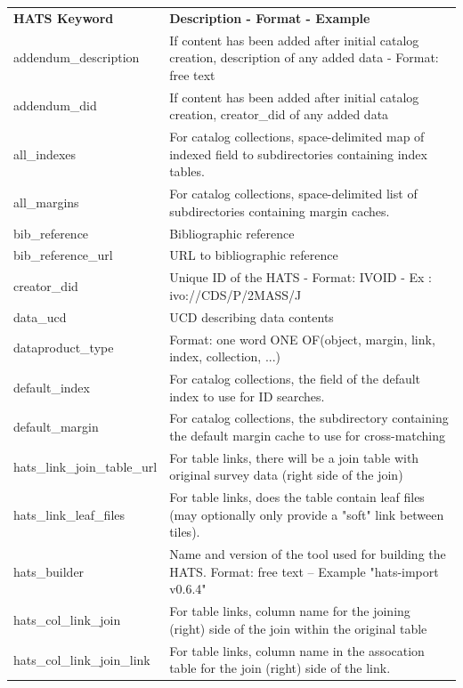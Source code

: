 \documentclass[11pt,a4paper]{ivoa}
\begin{document}
{\footnotesize
\begin{longtable}[h!]{p{} p{}}
\sptablerule
\textbf{HATS Keyword}&\textbf{Description - Format - Example}\\
\sptablerule
\endhead

addendum\_description &If content has been added after initial catalog creation, description of any added data - Format: free text \\
addendum\_did &If content has been added after initial catalog creation, creator\_did of any added data \\
all\_indexes &For catalog collections, space-delimited map of indexed field to subdirectories containing index tables. \\
all\_margins &For catalog collections, space-delimited list of subdirectories containing margin caches. \\
bib\_reference &Bibliographic reference \\
bib\_reference\_url &URL to bibliographic reference \\
creator\_did &Unique ID of the HATS - Format: IVOID - Ex : ivo://CDS/P/2MASS/J \\
data\_ucd &UCD describing data contents \citep{ucd1plus2024} \\
dataproduct\_type &Format: one word ONE OF(object, margin, link, index, collection, ...) \\
default\_index &For catalog collections, the field of the default index to use for ID searches. \\
default\_margin &For catalog collections, the subdirectory containing the default margin cache to use for cross-matching \\
hats\_link\_join\_table\_url &For table links, there will be a join table with original survey data (right side of the join) \\
hats\_link\_leaf\_files &For table links, does the table contain leaf files (may optionally only provide a "soft" link between tiles). \\
hats\_builder &Name and version of the tool used for building the HATS. Format: free text -- Example "hats-import v0.6.4" \\
hats\_col\_link\_join &For table links, column name for the joining (right) side of the join within the original table \\
hats\_col\_link\_join\_link &For table links, column name in the assocation table for the join (right) side of the link. \\

\end{longtable}}
\end{document}
